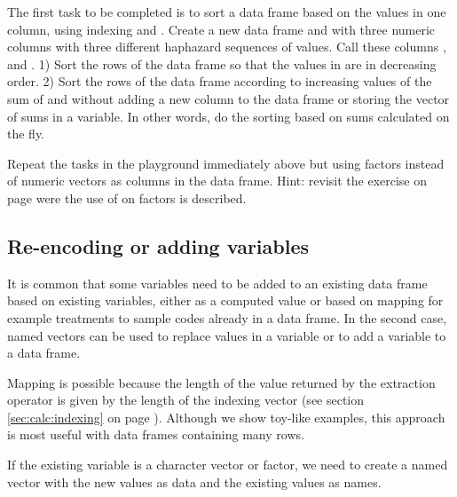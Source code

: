 \documentclass[krantz2]{krantz}\usepackage{knitr}
\begin{document}
\begin{playground}
The first task to be completed is to sort a data frame based on the values in one column, using indexing and . Create a new data frame and with three numeric columns with three different haphazard sequences of values. Call these columns ,  and . 1) Sort the rows of the data frame so that the values in  are in decreasing order. 2) Sort the rows of the data frame according to increasing values of the sum of  and  without adding a new column to the data frame or storing the vector of sums in a variable. In other words, do the sorting based on sums calculated on the fly.
\end{playground}

\begin{advplayground}
Repeat the tasks in the playground immediately above but using factors instead of numeric vectors as columns in the data frame. Hint: revisit the exercise on page \pageref{calc:ADVPG:order:sort} were the use of  on factors is described.
\end{advplayground}

\subsection{Re-encoding or adding variables}

It is common that some variables need to be added to an existing data frame based on existing variables, either as a computed value or based on mapping for example treatments to sample codes already in a data frame. In the second case, named vectors can be used to replace values in a variable or to add a variable to a data frame.

Mapping is possible because the length of the value returned by the extraction operator \Roperator{[ ]} is given by the length of the indexing vector (see section \ref{sec:calc:indexing} on page \pageref{sec:calc:indexing}). Although we show toy-like examples, this approach is most useful with data frames containing many rows.

If the existing variable is a character vector or factor, we need to create a named vector with the new values as data and the existing values as names.
\end{document}
